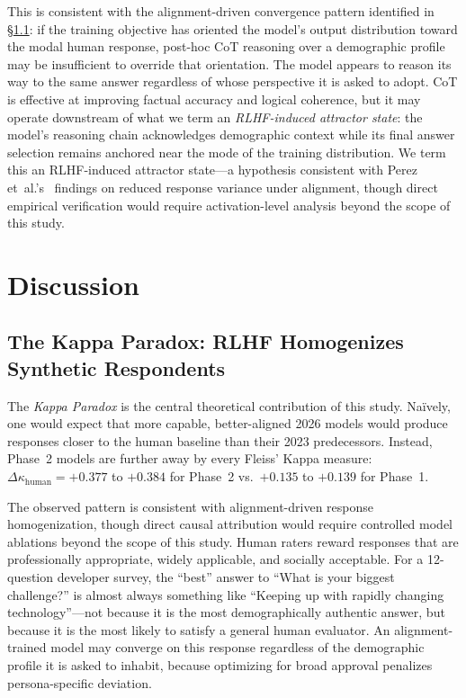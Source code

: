 \documentclass[sigconf,nonacm]{acmart}
\newcommand{\kp}{\textit{Kappa Paradox}\xspace}
\begin{document}
This is consistent with the alignment-driven convergence pattern identified
in \S\ref{sec:disc:kappa}: if the training objective has oriented the model's
output distribution toward the modal human response, post-hoc CoT reasoning
over a demographic profile may be insufficient to override that orientation.
The model appears to reason its way to the same answer regardless of whose
perspective it is asked to adopt.
CoT is effective at improving factual accuracy and logical coherence, but it
may operate downstream of what we term an \emph{RLHF-induced attractor state}:
the model's reasoning chain acknowledges demographic context while its final
answer selection remains anchored near the mode of the training distribution.
We term this an RLHF-induced attractor state---a hypothesis consistent with
Perez et~al.'s~\cite{perez2022} findings on reduced response variance under
alignment, though direct empirical verification would require
activation-level analysis beyond the scope of this study.

\section{Discussion}
\label{sec:discussion}

\subsection{The Kappa Paradox: RLHF Homogenizes Synthetic Respondents}
\label{sec:disc:kappa}

The \kp is the central theoretical contribution of this study.
Na\"{i}vely, one would expect that more capable, better-aligned 2026 models
would produce responses closer to the human baseline than their 2023
predecessors.
Instead, Phase~2 models are further away by every Fleiss' Kappa measure:
$\Delta \kappa_{\text{human}} = +0.377$ to $+0.384$ for Phase~2 vs.\
$+0.135$ to $+0.139$ for Phase~1.

The observed pattern is consistent with alignment-driven response
homogenization, though direct causal attribution would require
controlled model ablations beyond the scope of this study.
Human raters reward responses that are professionally appropriate,
widely applicable, and socially acceptable.
For a 12-question developer survey, the ``best'' answer to ``What is your
biggest challenge?'' is almost always something like ``Keeping up with
rapidly changing technology''---not because it is the most demographically
authentic answer, but because it is the most likely to satisfy a general
human evaluator.
An alignment-trained model may converge on this response regardless of the
demographic profile it is asked to inhabit, because optimizing for broad
approval penalizes persona-specific deviation.
\end{document}
